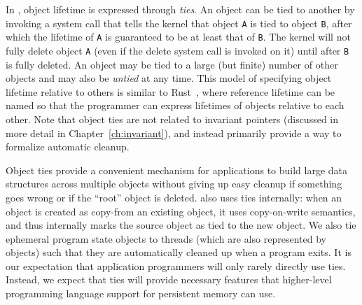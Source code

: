 In \Twizzler, object lifetime is expressed through \emph{ties}.
An object can be tied to another by invoking a system call that tells the kernel that
object \texttt{A} is tied to object \texttt{B}, after which the lifetime of \texttt{A} is
guaranteed to be at least that of \texttt{B}. The kernel will not fully delete object \texttt{A} (even if the
delete system call is invoked on it) until after \texttt{B} is fully deleted. An object may be tied
to a large (but finite) number of other objects and may also be \emph{untied} at any time. This
model of specifying object lifetime relative to others is similar to Rust~\cite{rust}, where
reference lifetime can be named so that the programmer can express lifetimes of objects relative to
each other. Note that object ties are not related to invariant pointers (discussed in more detail
in Chapter~\ref{ch:invariant}), and instead primarily provide a way to formalize automatic cleanup.


Object ties provide a convenient mechanism for applications to build large data structures across
multiple objects without giving up easy cleanup if something goes wrong or if the ``root'' object is
deleted. \Twizzler also uses ties internally: when an object is created as copy-from an existing
object, it uses copy-on-write semantics, and thus internally marks the source object as tied to the
new object. We also tie ephemeral program state objects to threads (which are also represented by
objects) such that they are automatically cleaned up when a program exits. It is our expectation
that application programmers will only rarely directly use ties. Instead, we expect that ties will
provide necessary features that higher-level programming language support for persistent memory can
use.

